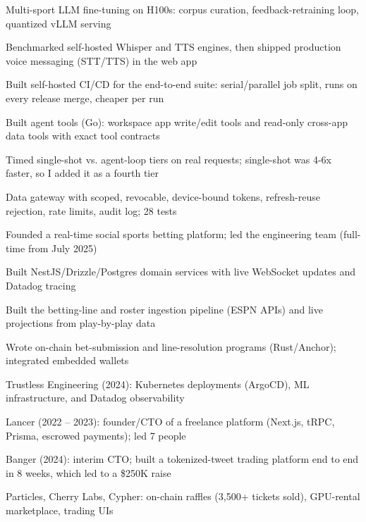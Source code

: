 \documentclass[print]{jack-resume}
\begin{document}
\begin{tightemize}
    \item Multi-sport LLM fine-tuning on H100s: corpus curation, feedback-retraining loop, quantized vLLM serving
    \item Benchmarked self-hosted Whisper and TTS engines, then shipped production voice messaging (STT/TTS) in the web app
    \item Built self-hosted CI/CD for the end-to-end suite: serial/parallel job split, runs on every release merge, cheaper per run
    \item Built agent tools (Go): workspace app write/edit tools and read-only cross-app data tools with exact tool contracts
    \item Timed single-shot vs. agent-loop tiers on real requests; single-shot was 4-6x faster, so I added it as a fourth tier
    \item Data gateway with scoped, revocable, device-bound tokens, refresh-reuse rejection, rate limits, audit log; 28 tests
\end{tightemize}
\sectionsep

\begin{tightemize}
    \item Founded a real-time social sports betting platform; led the engineering team (full-time from July 2025)
    \item Built NestJS/Drizzle/Postgres domain services with live WebSocket updates and Datadog tracing
    \item Built the betting-line and roster ingestion pipeline (ESPN APIs) and live projections from play-by-play data
    \item Wrote on-chain bet-submission and line-resolution programs (Rust/Anchor); integrated embedded wallets
\end{tightemize}
\sectionsep

\begin{tightemize}
    \item Trustless Engineering (2024): Kubernetes deployments (ArgoCD), ML infrastructure, and Datadog observability
    \item Lancer (2022 – 2023): founder/CTO of a freelance platform (Next.js, tRPC, Prisma, escrowed payments); led 7 people
    \item Banger (2024): interim CTO; built a tokenized-tweet trading platform end to end in 8 weeks, which led to a \$250K raise
    \item Particles, Cherry Labs, Cypher: on-chain raffles (3,500+ tickets sold), GPU-rental marketplace, trading UIs
\end{tightemize}
\sectionsep
\end{document}
